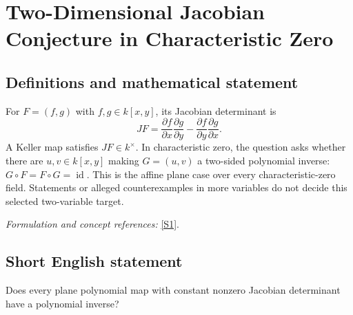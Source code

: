 \documentclass[11pt]{article}
\newcommand{\sref}[2]{\hyperlink{source:#1:#2}{[S#2]}}
\newif\ifshowcatalogue
\newcommand{\cataloguescope}[1]{\ifshowcatalogue
 \paragraph{Exact scope in the supplied catalogue.}
 \begin{quote}\small #1\end{quote}\fi}
\begin{document}
\setcounter{section}{0}
\clearpage
\section*{\texorpdfstring{Two-Dimensional Jacobian Conjecture in Characteristic Zero}{Two-Dimensional Jacobian Conjecture in Characteristic Zero}}\label{statement}
\subsection{Definitions and mathematical statement}
For $F=(f,g)$ with $f,g\in k[x,y]$, its Jacobian determinant is
\[
 JF=\frac{\partial f}{\partial x}\frac{\partial g}{\partial y}
       -\frac{\partial f}{\partial y}\frac{\partial g}{\partial x}.
\]
A Keller map satisfies $JF\in k^\times$. In characteristic zero, the question asks whether there are $u,v\in k[x,y]$ making $G=(u,v)$ a two-sided polynomial inverse: $G\circ F=F\circ G=\operatorname{id}$. This is the affine plane case over every characteristic-zero field. Statements or alleged counterexamples in more variables do not decide this selected two-variable target.
\par\smallskip\textit{Formulation and concept references:} \sref{statement}{1}.
\cataloguescope{Let k be a field of characteristic zero and let F:k\textasciicircum{}2 -> k\textasciicircum{}2 be a polynomial map whose Jacobian determinant is a nonzero constant. Determine whether F must have a polynomial inverse, equivalently whether every two-variable Keller map is a polynomial automorphism of the affine plane.}

\subsection{Short English statement}
Does every plane polynomial map with constant nonzero Jacobian determinant have a polynomial inverse?
\end{document}
